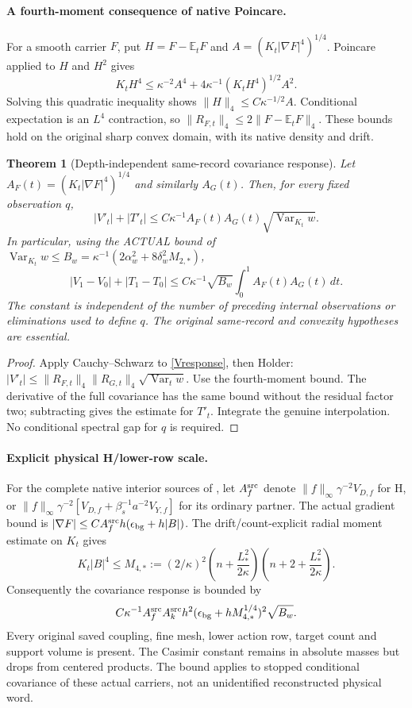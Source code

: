 \documentclass[11pt]{article}
\newtheorem{theorem}{Theorem}
\newcommand{\E}{\mathbb E}
\newcommand{\Var}{\operatorname{Var}}
\begin{document}
\paragraph{A fourth-moment consequence of native Poincare.}
For a smooth carrier $F$, put $H=F-\E_tF$ and $A=(K_t|\nabla F|^4)^{1/4}$.
Poincare applied to $H$ and $H^2$ gives
\[
 K_tH^4\le\kappa^{-2}A^4
    +4\kappa^{-1}(K_tH^4)^{1/2}A^2.
\]
Solving this quadratic inequality shows
$\|H\|_4\le C\kappa^{-1/2}A$.
Conditional expectation is an $L^4$ contraction, so
$\|R_{F,t}\|_4\le2\|F-\E_tF\|_4$.
These bounds hold on the original sharp convex domain, with its native density and drift.

\begin{theorem}[Depth-independent same-record covariance response]
Let $A_F(t)=(K_t|\nabla F|^4)^{1/4}$ and similarly $A_G(t)$.
Then, for every fixed observation $q$,
\[
 |V'_t|+|T'_t|
 \le C\kappa^{-1}A_F(t)A_G(t)\sqrt{\Var_{K_t}w}.
\]
In particular, using the ACTUAL bound of \cite[Section~4]{ND}
$\Var_{K_t}w\le B_w=\kappa^{-1}(2\alpha_w^2+8\delta_w^2M_{2,*})$,
\[
 |V_1-V_0|+|T_1-T_0|
 \le C\kappa^{-1}\sqrt{B_w}\int_0^1 A_F(t)A_G(t)\,dt.
\]
The constant is independent of the number of preceding internal observations or eliminations
used to define $q$. The original same-record and convexity hypotheses are essential.
\end{theorem}
\begin{proof}
Apply Cauchy--Schwarz to \eqref{Vresponse}, then Holder:
$|V'_t|\le\|R_{F,t}\|_4\|R_{G,t}\|_4\sqrt{\Var_tw}$.
Use the fourth-moment bound. The derivative of the full covariance has the same bound
without the residual factor two; subtracting gives the estimate for $T'_t$.
Integrate the genuine interpolation. No conditional spectral gap for $q$ is required.
\end{proof}

\paragraph{Explicit physical H/lower-row scale.}
For the complete native interior sources of \cite[Section~5]{ND}, let $A_f^{\rm src}$ denote
$\|f\|_\infty\gamma^{-2}V_{D,f}$ for H, or
$\|f\|_\infty\gamma^{-2}[V_{D,f}+\beta_s^{-1}a^{-2}V_{Y,f}]$ for its ordinary partner.
The actual gradient bound is $|\nabla F|\le C A_f^{\rm src}h(\epsilon_{\rm bg}+h|B|)$.
The drift/count-explicit radial moment estimate on $K_t$ gives
\[
 K_t|B|^4\le M_{4,*}:=
 (2/\kappa)^2\left(n+\frac{L_*^2}{2\kappa}\right)
              \left(n+2+\frac{L_*^2}{2\kappa}\right).
\]
Consequently the covariance response is bounded by
\[
 C\kappa^{-1}A_f^{\rm src}A_k^{\rm src}h^2
   (\epsilon_{\rm bg}+hM_{4,*}^{1/4})^2\sqrt{B_w}.
\]
Every original saved coupling, fine mesh, lower action row, target count and support volume
is present. The Casimir constant remains in absolute masses but drops from centered products.
The bound applies to stopped conditional covariance of these actual carriers, not an
unidentified reconstructed physical word.
\end{document}
